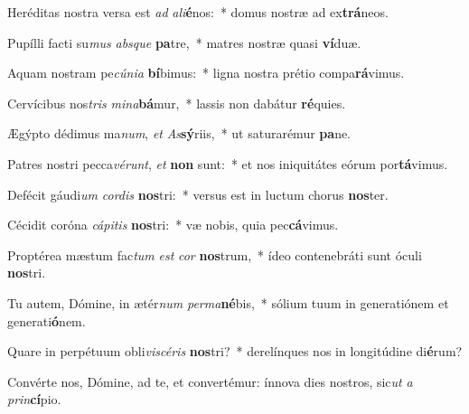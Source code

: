 \item Heréditas nostra versa est \textit{ad} \textit{a}\textit{li}\textbf{é}nos:~* domus nostræ ad ex\textbf{trá}neos.
\item Pupílli facti su\textit{mus} \textit{abs}\textit{que} \textbf{pa}tre,~* matres nostræ quasi \textbf{ví}duæ.
\item Aquam nostram pe\textit{cú}\textit{ni}\textit{a} \textbf{bí}bimus:~* ligna nostra prétio compa\textbf{rá}vimus.
\item Cervícibus nos\textit{tris} \textit{mi}\textit{na}\textbf{bá}mur,~* lassis non dabátur \textbf{ré}quies.
\item Ægýpto dédimus ma\textit{num}, \textit{et} \textit{As}\textbf{sý}riis,~* ut saturarémur \textbf{pa}ne.
\item Patres nostri pecca\textit{vé}\textit{runt}, \textit{et} \textbf{non} sunt:~* et nos iniquitátes eórum por\textbf{tá}vimus.
\item Defécit gáudi\textit{um} \textit{cor}\textit{dis} \textbf{nos}tri:~* versus est in luctum chorus \textbf{nos}ter.
\item Cécidit coróna \textit{cá}\textit{pi}\textit{tis} \textbf{nos}tri:~* væ nobis, quia pec\textbf{cá}vimus.
\item Proptérea mæstum fac\textit{tum} \textit{est} \textit{cor} \textbf{nos}trum,~* ídeo contenebráti sunt óculi \textbf{nos}tri.
\item Tu autem, Dómine, in ætér\textit{num} \textit{per}\textit{ma}\textbf{né}bis,~* sólium tuum in generatiónem et generati\textbf{ó}nem.
\item Quare in perpétuum obli\textit{vi}\textit{scé}\textit{ris} \textbf{nos}tri?~* derelínques nos in longitúdine di\textbf{é}rum?
\item Convérte nos, Dómine, ad te, et convertémur: ínnova dies nostros, sic\textit{ut} \textit{a} \textit{prin}\textbf{cí}pio.
